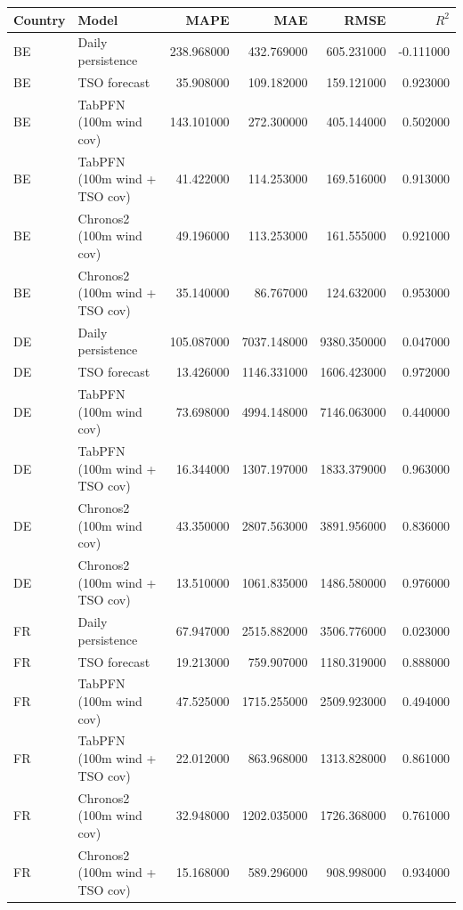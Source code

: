 \begin{tabular}{llrrrr}
\toprule
Country & Model & MAPE & MAE & RMSE & $R^2$ \\
\midrule
BE & Daily persistence & 238.968000 & 432.769000 & 605.231000 & -0.111000 \\
BE & TSO forecast & 35.908000 & 109.182000 & 159.121000 & 0.923000 \\
BE & TabPFN (100m wind cov) & 143.101000 & 272.300000 & 405.144000 & 0.502000 \\
BE & TabPFN (100m wind + TSO cov) & 41.422000 & 114.253000 & 169.516000 & 0.913000 \\
BE & Chronos2 (100m wind cov) & 49.196000 & 113.253000 & 161.555000 & 0.921000 \\
BE & Chronos2 (100m wind + TSO cov) & 35.140000 & 86.767000 & 124.632000 & 0.953000 \\
DE & Daily persistence & 105.087000 & 7037.148000 & 9380.350000 & 0.047000 \\
DE & TSO forecast & 13.426000 & 1146.331000 & 1606.423000 & 0.972000 \\
DE & TabPFN (100m wind cov) & 73.698000 & 4994.148000 & 7146.063000 & 0.440000 \\
DE & TabPFN (100m wind + TSO cov) & 16.344000 & 1307.197000 & 1833.379000 & 0.963000 \\
DE & Chronos2 (100m wind cov) & 43.350000 & 2807.563000 & 3891.956000 & 0.836000 \\
DE & Chronos2 (100m wind + TSO cov) & 13.510000 & 1061.835000 & 1486.580000 & 0.976000 \\
FR & Daily persistence & 67.947000 & 2515.882000 & 3506.776000 & 0.023000 \\
FR & TSO forecast & 19.213000 & 759.907000 & 1180.319000 & 0.888000 \\
FR & TabPFN (100m wind cov) & 47.525000 & 1715.255000 & 2509.923000 & 0.494000 \\
FR & TabPFN (100m wind + TSO cov) & 22.012000 & 863.968000 & 1313.828000 & 0.861000 \\
FR & Chronos2 (100m wind cov) & 32.948000 & 1202.035000 & 1726.368000 & 0.761000 \\
FR & Chronos2 (100m wind + TSO cov) & 15.168000 & 589.296000 & 908.998000 & 0.934000 \\
\bottomrule
\end{tabular}

